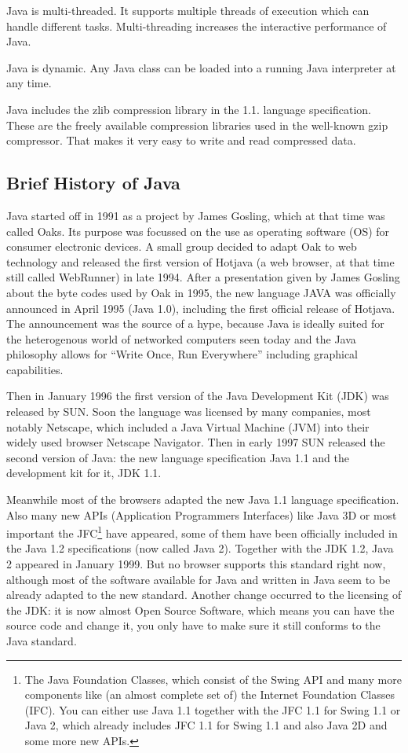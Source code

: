 Java is multi-threaded. It supports multiple threads of execution which can 
handle different tasks. Multi-threading increases the interactive performance 
of Java.

Java is dynamic. Any Java class can be loaded into a running Java interpreter 
at any time.

Java includes the zlib compression library in the 1.1. language specification.
These are
the freely available compression libraries used in the well-known
gzip compressor.
That makes it very easy to write and read compressed data. 


\subsection{Brief History of Java}
Java started off in 1991 as a project by James Gosling, which at that 
time was called
Oaks. Its purpose was focussed on the use as operating  
software (OS) for consumer
electronic devices. A small group decided to adapt Oak to web
technology and released the first version of Hotjava (a web browser, at that
time still called WebRunner)
in late 1994. After a presentation given by James Gosling about the 
byte codes used by Oak in 1995, the new language JAVA was officially 
announced in April 1995 (Java 1.0), 
including the first official release of Hotjava.
The announcement was the source of a hype, because Java is ideally
suited for the heterogenous world of networked computers seen today and
the Java philosophy allows for ``Write Once, Run Everywhere'' including
graphical capabilities.

Then in January 1996 the first version of the Java Development Kit (JDK) 
was released by SUN. Soon the language was licensed by many companies,
most notably Netscape, which included a Java Virtual Machine (JVM) into
their widely used browser Netscape Navigator. Then in early 1997
SUN released the second version of Java: the new language specification 
Java 1.1 and the development kit for it, JDK 1.1.

Meanwhile most of the browsers adapted the new Java 1.1 language specification.
Also many new APIs (Application Programmers Interfaces) like Java 3D or 
most important the JFC\footnote{The Java Foundation Classes, which
consist of the Swing API and many more components like (an 
almost complete set of)  
the Internet Foundation Classes (IFC). You can either use Java 1.1 together
with the JFC 1.1 for Swing 1.1 or Java 2, which already includes JFC 1.1 for
Swing 1.1 and also Java 2D and some more new APIs.}
have appeared, some
of them have been officially included in the Java 1.2 specifications
(now called Java 2). Together with the JDK 1.2, Java 2 appeared in January 1999.
But no browser supports this standard right now, although most
of the software available for Java and written in Java seem to be
already adapted to the new standard. Another change occurred to the
licensing of the JDK: it is now almost Open Source Software, which
means you can have the source code and change it, you only have to make
sure it still conforms to the Java standard.

